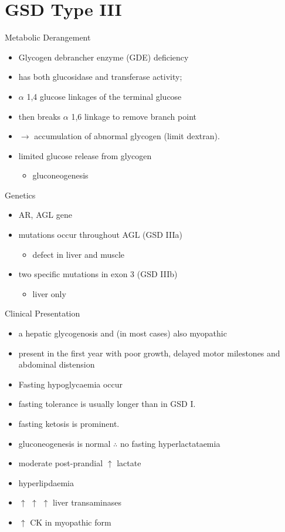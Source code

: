 \documentclass[presentation, smaller]{beamer}
\begin{document}
\section{GSD Type III}
\label{sec:org43357b5}
\begin{frame}[label={sec:org850737a}]{Metabolic Derangement}
\begin{itemize}
\item Glycogen debrancher enzyme (GDE) deficiency
\item has both glucosidase and transferase activity;
\item \(\alpha\) 1,4 glucose linkages of the terminal glucose
\item then breaks \(\alpha\) 1,6 linkage to remove branch point
\item \(\to\) accumulation of abnormal glycogen (limit dextran).
\item limited glucose release from glycogen
\begin{itemize}
\item gluconeogenesis
\end{itemize}
\end{itemize}
\end{frame}
\begin{frame}[label={sec:org391639a}]{Genetics}
\begin{itemize}
\item AR, AGL gene
\item mutations occur throughout AGL (GSD IIIa)
\begin{itemize}
\item defect in liver and muscle
\end{itemize}
\item two specific mutations in exon 3 (GSD IIIb)
\begin{itemize}
\item liver only
\end{itemize}
\end{itemize}
\end{frame}
\begin{frame}[label={sec:org4bd6777}]{Clinical Presentation}
\begin{itemize}
\item a hepatic glycogenosis and (in most cases) also myopathic
\item present in the first year with poor growth, delayed motor milestones
and abdominal distension
\item Fasting hypoglycaemia occur
\item fasting tolerance is usually longer than in GSD I.
\item fasting ketosis is prominent.
\item gluconeogenesis is normal \(\therefore\) no fasting hyperlactataemia
\item moderate post-prandial \(\uparrow\) lactate
\item hyperlipdaemia
\item \(\uparrow\) \(\uparrow\) \(\uparrow\) liver transaminases
\item \(\uparrow\) CK in myopathic form
\end{itemize}
\end{frame}
\end{document}

